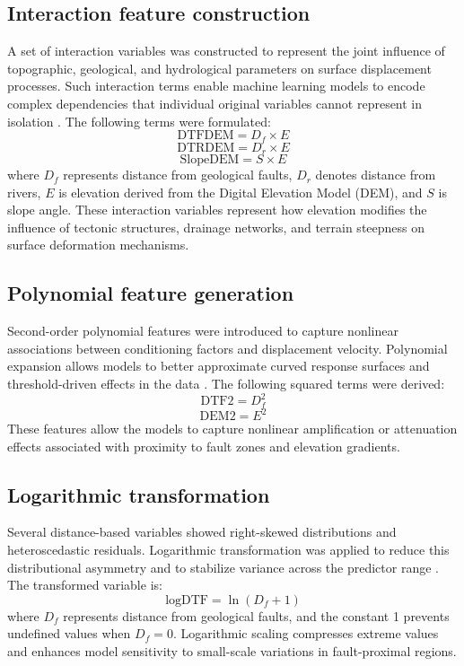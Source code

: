 \documentclass[oneside,doublespacing,flushright]{lsuthesis}
\begin{document}
\subsection{Interaction feature construction}
A set of interaction variables was constructed to represent the joint influence of topographic, geological, and hydrological parameters on surface displacement processes. Such interaction terms enable machine learning models to encode complex dependencies that individual original variables cannot represent in isolation \citep{Kuhn2019}. The following terms were formulated:
\begin{equation}
\text{DTFDEM} = D_f \times E
\end{equation}
\begin{equation}
\text{DTRDEM} = D_r \times E
\end{equation}
\begin{equation}
\text{SlopeDEM} = S \times E
\end{equation}
where $D_f$ represents distance from geological faults, $D_r$ denotes distance from rivers, $E$ is elevation derived from the Digital Elevation Model (DEM), and $S$ is slope angle. These interaction variables represent how elevation modifies the influence of tectonic structures, drainage networks, and terrain steepness on surface deformation mechanisms.


\subsection{Polynomial feature generation}
Second-order polynomial features were introduced to capture nonlinear associations between conditioning factors and displacement velocity. Polynomial expansion allows models to better approximate curved response surfaces and threshold-driven effects in the data \citep{Hastie2009}. The following squared terms were derived:
\begin{equation}
\text{DTF2} = D_f^2
\end{equation}
\begin{equation}
\text{DEM2} = E^2
\end{equation}
These features allow the models to capture nonlinear amplification or attenuation effects associated with proximity to fault zones and elevation gradients.

\subsection{Logarithmic transformation}
Several distance-based variables showed right-skewed distributions and heteroscedastic residuals. Logarithmic transformation was applied to reduce this distributional asymmetry and to stabilize variance across the predictor range \citep{Osborne2010}. The transformed variable is:
\begin{equation}
\text{logDTF} = \ln(D_f + 1)
\end{equation}
where $D_f$ represents distance from geological faults, and the constant 1 prevents undefined values when $D_f = 0$. Logarithmic scaling compresses extreme values and enhances model sensitivity to small-scale variations in fault-proximal regions.
\end{document}
